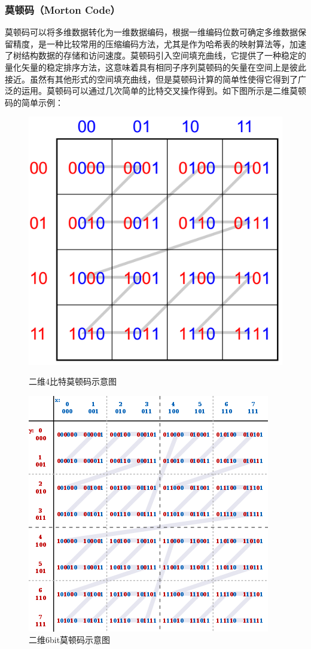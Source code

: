 \documentclass[11pt]{article}
\begin{document}
\subsubsection{莫顿码（Morton Code）}
莫顿码可以将多维数据转化为一维数据编码，根据一维编码位数可确定多维数据保留精度，是一种比较常用的压缩编码方法，尤其是作为哈希表的映射算法等，加速了树结构数据的存储和访问速度。莫顿码引入空间填充曲线，它提供了一种稳定的量化矢量的稳定排序方法，这意味着具有相同子序列莫顿码的矢量在空间上是彼此接近。虽然有其他形式的空间填充曲线，但是莫顿码计算的简单性使得它得到了广泛的运用。莫顿码可以通过几次简单的比特交叉操作得到。如下图所示是二维莫顿码的简单示例：
\begin{figure}[H]
\begin{center}
\includegraphics[scale=0.4]{morton-code.png}
\caption{二维4比特莫顿码示意图}
\includegraphics[scale=0.7]{morton-code3.png}
\caption{二维6bit莫顿码示意图}
\end{center}
\end{figure}
\end{document}
